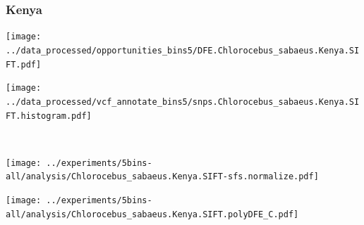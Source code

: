 \subsubsection{Kenya}

\begin{minipage}{0.49\linewidth}
    \texttt{[image: ../data\_processed/opportunities\_bins5/DFE.Chlorocebus\_sabaeus.Kenya.SIFT.pdf]}
\end{minipage}
\begin{minipage}{0.49\linewidth}
    \texttt{[image: ../data\_processed/vcf\_annotate\_bins5/snps.Chlorocebus\_sabaeus.Kenya.SIFT.histogram.pdf]}
\end{minipage}
\\
\begin{minipage}{0.49\linewidth}
    \texttt{[image: ../experiments/5bins-all/analysis/Chlorocebus\_sabaeus.Kenya.SIFT-sfs.normalize.pdf]}
\end{minipage}
\begin{minipage}{0.4\linewidth}
    \texttt{[image: ../experiments/5bins-all/analysis/Chlorocebus\_sabaeus.Kenya.SIFT.polyDFE\_C.pdf]}
\end{minipage}
